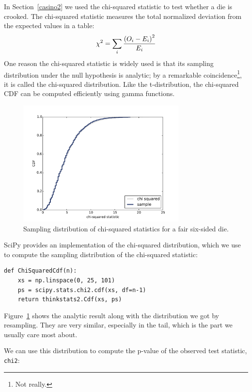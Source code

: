 \documentclass[12pt]{book}
\begin{document}
In Section~\ref{casino2} we used the chi-squared statistic to
test whether a die is crooked.  The chi-squared statistic measures
the total normalized deviation from the expected values in a table:
%
\[ \chi^2 = \sum_i \frac{{(O_i - E_i)}^2}{E_i} \]
%
One reason the chi-squared statistic is widely used is that
its sampling distribution under the null hypothesis is analytic;
by a remarkable coincidence\footnote{Not really.}, it is called
the chi-squared distribution.  Like the t-distribution, the
chi-squared CDF can be computed efficiently using gamma functions.

\begin{figure}
\centerline{\includegraphics[height=2.5in]{figs/normal5.pdf}}
\caption{Sampling distribution of chi-squared statistics for
a fair six-sided die.}
\label{normal5}
\end{figure}

SciPy provides an implementation of the chi-squared distribution,
which we use to compute the sampling distribution of the
chi-squared statistic:

\begin{verbatim}
def ChiSquaredCdf(n):
    xs = np.linspace(0, 25, 101)
    ps = scipy.stats.chi2.cdf(xs, df=n-1)
    return thinkstats2.Cdf(xs, ps)
\end{verbatim}

Figure~\ref{normal5} shows the analytic result along with the
distribution we got by resampling.  They are very similar,
especially in the tail, which is the part we usually care most
about.

We can use this distribution to compute the p-value of the
observed test statistic, {\tt chi2}:
\end{document}
